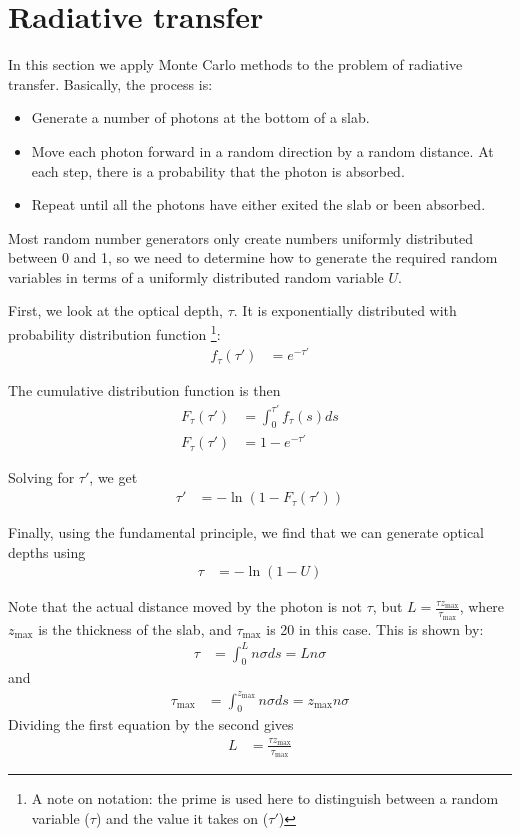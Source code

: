 \documentclass[twocolumn]{myarticle}
\begin{document}
\section{Radiative transfer}
\label{sec:radiative_transfer}

In this section we apply Monte Carlo methods to the problem of radiative transfer.
Basically, the process is:
\begin{itemize}
\item
    Generate a number of photons at the bottom of a slab.
\item
    Move each photon forward in a random direction by a random distance.
    At each step, there is a probability that the photon is absorbed.
\item
    Repeat until all the photons have either exited the slab or been absorbed.
\end{itemize}

Most random number generators only create numbers uniformly distributed between 0 and 1, so we need to determine how to generate the required random variables in terms of a uniformly distributed random variable $ U $.

First, we look at the optical depth, $ \tau $.
It is exponentially distributed with probability distribution function
\footnote{A note on notation: the prime is used here to distinguish between a random variable ($ \tau $) and the value it takes on ($ \tau' $)}:
\begin{align}
    f_\tau(\tau') &= e^{-\tau'}
\end{align}

The cumulative distribution function is then
\begin{align}
    F_\tau (\tau') &= \int_0^{\tau'} f_\tau (s) d s
    \\
    F_\tau (\tau') &= 1 - e^{-\tau'}
\end{align}

Solving for $ \tau' $, we get
\begin{align}
    \tau' &= - \ln \left( 1 - F_\tau(\tau') \right)
\end{align}

Finally, using the fundamental principle, we find that we can generate optical depths using
\begin{align}
    \tau &= - \ln \left( 1 - U \right)
\end{align}

Note that the actual distance moved by the photon is not $ \tau $, but $ L = \frac{\tau z_\text{max}}{\tau_\text{max}} $, where $ z_\text{max} $ is the thickness of the slab, and $ \tau_\text{max} $ is 20 in this case.
This is shown by:
\begin{align}
    \tau &= \int_0^L n \sigma ds = L n \sigma
\end{align}
and
\begin{align}
    \tau_\text{max} &= \int_0^{z_\text{max}} n \sigma ds = z_\text{max} n \sigma
\end{align}
Dividing the first equation by the second gives
\begin{align}
    L &= \frac{\tau z_\text{max}}{\tau_\text{max}}
\end{align}
\end{document}
